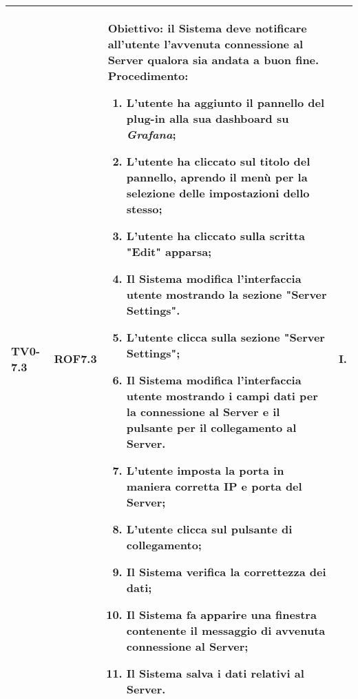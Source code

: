 \begin{longtable}{|C{.15\textwidth}|C{.13\textwidth}|m{.52\textwidth}|C{.08\textwidth}|}
TV0-7.3 & ROF7.3 &
	\textbf{Obiettivo}: il Sistema deve notificare all'utente l'avvenuta connessione al Server qualora sia andata a buon fine. \newline
	\textbf{Procedimento}:
	\begin{enumerate}
		\item L'utente ha aggiunto il pannello del plug-in alla sua dashboard su \textit{Grafana};
		\item L'utente ha cliccato sul titolo del pannello, aprendo il menù per la selezione delle impostazioni dello stesso;
		\item L'utente ha cliccato sulla scritta "Edit" apparsa;
		\item Il Sistema modifica l'interfaccia utente mostrando la sezione "Server Settings".
		\item L'utente clicca sulla sezione "Server Settings";
		\item Il Sistema modifica l'interfaccia utente mostrando i campi dati per la connessione al Server e il pulsante per il collegamento al Server.
		\item L'utente imposta la porta in maniera corretta IP e porta del Server;
		\item L'utente clicca sul pulsante di collegamento;
		\item Il Sistema verifica la correttezza dei dati;
		\item Il Sistema fa apparire una finestra contenente il messaggio di avvenuta connessione al Server;
		\item Il Sistema salva i dati relativi al Server.
	\end{enumerate}
	& I. \\
\hline


\end{longtable}
